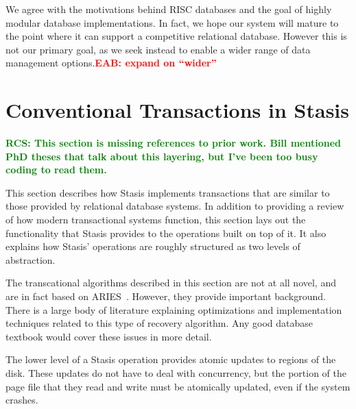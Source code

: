 \documentclass[letterpaper,twocolumn,10pt]{article}
\newcommand{\yad}{Stasis\xspace}
\newcommand{\yads}{Stasis'\xspace}
\newcommand{\eab}[1]{\textcolor{red}{\bf EAB: #1}}
\newcommand{\rcs}[1]{\textcolor{green}{\bf RCS: #1}}
\begin{document}
We agree with the motivations behind RISC databases and the goal
of highly modular database implementations.  In fact, we  hope
 our system will mature to the point where it can support 
a competitive relational database.  However this is
not our primary goal, as we seek instead to enable a wider range of data management options.\eab{expand on ``wider''}




\section{Conventional Transactions in \yad}

\rcs{This section is missing references to prior work.  Bill mentioned
PhD theses that talk about this layering, but I've been too busy
coding to read them.}

This section describes how \yad implements transactions that are
similar to those provided by relational database systems.  In addition
to providing a review of how modern transactional systems function,
this section lays out the functionality that \yad provides to the
operations built on top of it.  It also explains how \yads
operations are roughly structured as two levels of abstraction.  

The transcational algorithms described in this section are not at all
novel, and are in fact based on ARIES~\cite{aries}.  However, they
provide important background.  There is a large body of literature
explaining optimizations and implementation techniques related to this
type of recovery algorithm.  Any good database textbook would cover these
issues in more detail.

The lower level of a \yad operation provides atomic
updates to regions of the disk.  These updates do not have to deal
with concurrency, but the portion of the page file that they read and
write must be atomically updated, even if the system crashes.
\end{document}
